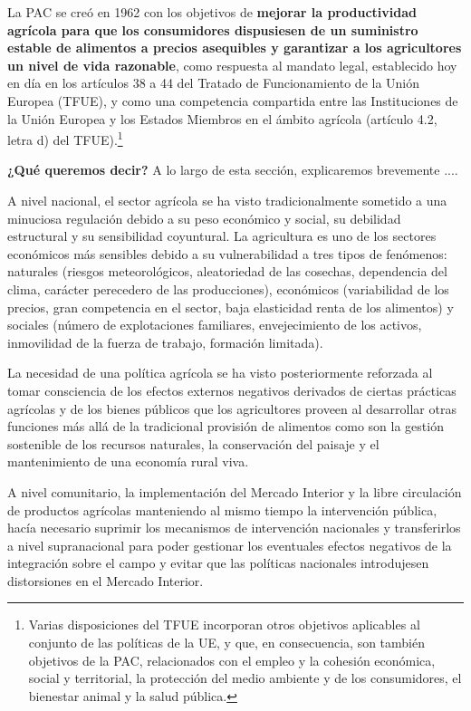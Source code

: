 \documentclass[10pt,a4paper]{article}
\begin{document}
La PAC se creó en 1962 con los objetivos de \textbf{mejorar la productividad agrícola para que los consumidores dispusiesen de un suministro estable de alimentos a precios asequibles y garantizar a los agricultores un nivel de vida razonable}, como respuesta al mandato legal, establecido hoy en día en los artículos 38 a 44 del Tratado de Funcionamiento de la Unión Europea (TFUE), y como una competencia compartida entre las Instituciones de la Unión Europea y los Estados Miembros en el ámbito agrícola (artículo 4.2, letra d) del TFUE).\footnote{%
    Varias disposiciones del TFUE incorporan otros objetivos aplicables al conjunto de las políticas de la UE, y que, en consecuencia, son también objetivos de la PAC, relacionados con el empleo y la cohesión económica, social y territorial, la protección del medio ambiente y de los consumidores, el bienestar animal y la salud pública.
}

\textbf{¿Qué queremos decir?} A lo largo de esta sección, explicaremos brevemente ....


A nivel nacional, el sector agrícola se ha visto tradicionalmente sometido a una minuciosa regulación debido a su peso económico y social, su debilidad estructural y su sensibilidad coyuntural. La agricultura es uno de los sectores económicos más sensibles debido a su vulnerabilidad a tres tipos de fenómenos: naturales (riesgos meteorológicos, aleatoriedad de las cosechas, dependencia del clima, carácter perecedero de las producciones), económicos (variabilidad de los precios, gran competencia en el sector, baja elasticidad renta de los alimentos) y sociales (número de explotaciones familiares, envejecimiento de los activos, inmovilidad de la fuerza de trabajo, formación limitada).

La necesidad de una política agrícola se ha visto posteriormente reforzada al tomar consciencia de los efectos externos negativos derivados de ciertas prácticas agrícolas y de los bienes públicos que los agricultores proveen al desarrollar otras funciones más allá de la tradicional provisión de alimentos como son la gestión sostenible de los recursos naturales, la conservación del paisaje y el mantenimiento de una economía rural viva.

A nivel comunitario, la implementación del Mercado Interior y la libre circulación de productos agrícolas manteniendo al mismo tiempo la intervención pública, hacía necesario suprimir los mecanismos de intervención nacionales y transferirlos a nivel supranacional para poder gestionar los eventuales efectos negativos de la integración sobre el campo y evitar que las políticas nacionales introdujesen distorsiones en el Mercado Interior.
\end{document}
